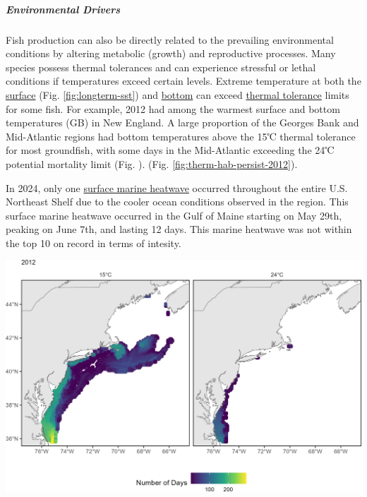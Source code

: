 \documentclass[
  10pt,
]{article}
\let\origfigure\figure
\let\endorigfigure\endfigure
\renewenvironment{figure}[1][2] {
    \expandafter\origfigure\expandafter[H]
} {
    \endorigfigure
}
\begin{document}
\hypertarget{environmental-drivers}{%
\subparagraph{Environmental Drivers}\label{environmental-drivers}}

Fish production can also be directly related to the prevailing environmental conditions by altering metabolic (growth) and reproductive processes. Many species possess thermal tolerances and can experience stressful or lethal conditions if temperatures exceed certain levels. Extreme temperature at both the \href{https://noaa-edab.github.io/catalog/seasonal_oisst_anom.html}{surface} (Fig. \ref{fig:longterm-sst}) and \href{https://noaa-edab.github.io/catalog/bottom_temp_comp.html}{bottom} can exceed \href{https://noaa-edab.github.io/catalog/thermal_habitat_persistence.html}{thermal tolerance} limits for some fish. For example, 2012 had among the warmest surface and bottom temperatures (GB) in New England. A large proportion of the Georges Bank and Mid-Atlantic regions had bottom temperatures above the 15℃ thermal tolerance for most groundfish, with some days in the Mid-Atlantic exceeding the 24℃ potential mortality limit (Fig. ).
(Fig. \ref{fig:therm-hab-persist-2012}).

In 2024, only one \href{https://noaa-edab.github.io/catalog/heatwave_year.html}{surface marine heatwave} occurred throughout the entire U.S. Northeast Shelf due to the cooler ocean conditions observed in the region. This surface marine heatwave occurred in the Gulf of Maine starting on May 29th, peaking on June 7th, and lasting 12 days. This marine heatwave was not within the top 10 on record in terms of intesity.

\begin{figure}

{\centering \includegraphics{SOE-NEFMC_files/figure-latex/therm-hab-persist-2012-1} 

}

\caption{The number of days in 2024 where bottom temperature exceeds 15℃ (left) and 24℃ (right) based on the GLORYS 1/12 degree grid.}\label{fig:therm-hab-persist-2012}
\end{figure}
\end{document}
